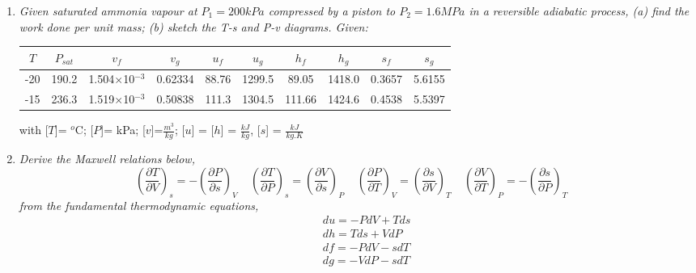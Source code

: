 \documentclass[12pts,a4paper,amsmath,amssymb,floatfix]{article}%
\newcommand{\frc}{\displaystyle\frac}
\begin{document}
\begin{enumerate}[label=\bfseries Problem \arabic*:]
\item {\it Given saturated ammonia vapour at $P_{1} = 200 kPa$ compressed by a piston to $P_{2} = 1.6 MPa$ in a reversible adiabatic process, (a) find the work done per unit mass; (b) sketch the T-s and P-v diagrams. Given:
\begin{center}
\begin{tabular}{||c|c|c c|c c|c c|c c||} 
\hline\hline
$T$ & $P_{sat}$ & $v_{f}$ &  $v_{g}$ & $u_{f}$ & $u_{g}$ &  $h_{f}$ &  $h_{g}$ & $s_{f}$ & $s_{g}$ \\ 
\hline
-20 & 190.2 & 1.504$\times$10$^{-3}$ & 0.62334 & 88.76 & 1299.5 & 89.05 & 1418.0 & 0.3657 & 5.6155 \\
\hline
-15 & 236.3 & 1.519$\times$10$^{-3}$ & 0.50838 & 111.3 & 1304.5 & 111.66 & 1424.6 & 0.4538 & 5.5397 \\ 
\hline\hline
\end{tabular}
\end{center}

with
[$T$]= $^{o}$C; [$P$]= kPa; [$v$]=$\frac{m^{3}}{kg}$; [$u$] = [$h$] = $\frac{kJ}{kg}$, [$s$] = $\frac{kJ}{kg.K}$ 
}
\item {\it Derive the Maxwell relations below,
\begin{displaymath}
%
 \left(\frac{\partial T}{\partial V}\right)_{s} = -\left(\frc{\partial P}{\partial s}\right)_{V} \;\;\;\;
%
 \left(\frc{\partial T}{\partial P}\right)_{s} = \left(\frac{\partial V}{\partial s}\right)_{P} \;\;\;\;
%
 \left(\frc{\partial P}{\partial T}\right)_{V} = \left(\frac{\partial s}{\partial V}\right)_{T} \;\;\;\;
%
  \left(\frac{\partial V}{\partial T}\right)_{P} = -\left(\frc{\partial s}{\partial P}\right)_{T} \;\;\;\; 
\end{displaymath}
from the fundamental thermodynamic equations,
\begin{eqnarray}
&& du = - PdV + Tds \nonumber \\ 
&& dh =   Tds + VdP \nonumber \\
&& df = - PdV - sdT \nonumber \\
&& dg = - VdP - sdT \nonumber
\end{eqnarray}}

\end{enumerate}
\end{document}
